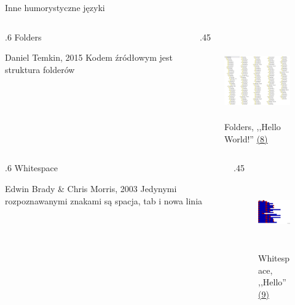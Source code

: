 \begin{frame}{Inne humorystyczne języki}
    \begin{columns}
        \begin{column}{.6\hsize}
            {\large Folders}
            \begin{itemize}
                \myitem Daniel Temkin, 2015
                \myitem Kodem źródłowym jest struktura folderów
            \end{itemize}
        \end{column}
        \begin{column}{.45\hsize}
            \begin{figure}
                {\hspace{0cm}\includegraphics[height=2.5cm]{figures/folders.jpg}}
                \caption*{\scriptsize Folders, ,,Hello World!''{\color{blue} \hyperlink{frame:przypisy}{(8)}}}
            \end{figure}
        \end{column}
    \end{columns}

    \begin{columns}
        \begin{column}{.6\hsize}
            {\large Whitespace}
            \begin{itemize}
                \myitem Edwin Brady \& Chris Morris, 2003
                \myitem Jedynymi rozpoznawanymi znakami są spacja, tab i nowa linia
            \end{itemize}
        \end{column}
        \begin{column}{.45\hsize}
            \begin{figure}
                {\hspace{0cm}\includegraphics[height=2.5cm]{figures/whitespace.png}}
                \caption*{\scriptsize Whitespace, ,,Hello''{\color{blue} \hyperlink{frame:przypisy}{(9)}}}
            \end{figure}
        \end{column}
    \end{columns}

\end{frame}